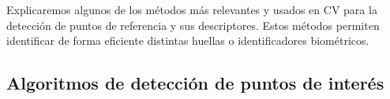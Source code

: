 


Explicaremos algunos de los métodos más relevantes y usados en \gls{CV} para la detección de puntos de referencia y sus descriptores. Estos métodos permiten identificar de forma eficiente distintas huellas o identificadores biométricos.

\subsection{Algoritmos de detección de puntos de interés}

